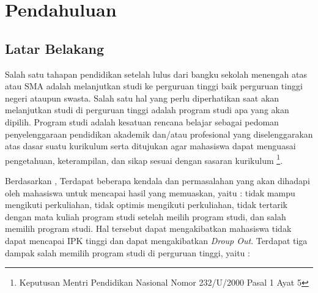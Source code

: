 \chapter{Pendahuluan}
\label{chap:pendahuluan}
   
\section{Latar Belakang}
\label{sec:latar belakang}
Salah satu tahapan pendidikan setelah lulus dari bangku sekolah menengah atas atau SMA adalah melanjutkan studi ke perguruan tinggi baik perguruan tinggi negeri ataupun swasta. Salah satu hal yang perlu diperhatikan saat akan melanjutkan studi di perguruan tinggi adalah program studi apa yang akan dipilih. Program studi adalah kesatuan rencana belajar sebagai pedoman penyelenggaraan pendidikan akademik dan/atau profesional yang diselenggarakan atas dasar suatu kurikulum serta ditujukan agar mahasiswa dapat menguasai pengetahuan, keterampilan, dan sikap sesuai dengan sasaran kurikulum \footnote{Keputusan Mentri Pendidikan Nasional Nomor 232/U/2000 Pasal 1 Ayat 5}. %


Berdasarkan \cite{sistem:informasi:kaputama}, Terdapat beberapa kendala dan permasalahan yang akan dihadapi oleh mahasiswa untuk mencapai hasil yang memuaskan, yaitu : tidak mampu mengikuti perkuliahan, tidak optimis mengikuti perkuliahan, tidak tertarik dengan mata kuliah program studi setelah meilih program studi, dan salah memilih program studi. Hal tersebut dapat mengakibatkan mahasiswa tidak dapat mencapai IPK tinggi dan dapat mengakibatkan \textit{Droup Out}. Terdapat tiga dampak salah memilih program studi di perguruan tinggi, yaitu :

